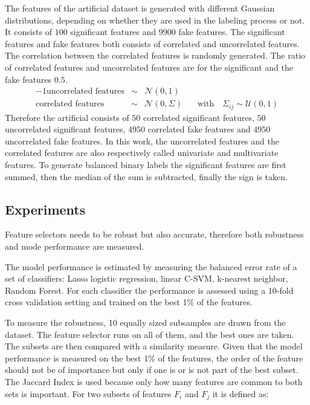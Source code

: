 \documentclass[twoside,11pt]{article}
\begin{document}
The features of the artificial dataset is generated with different Gaussian distributions, depending on whether they are used in the labeling process or not. It consists of $100$ significant features and $9900$ fake features. The significant features and fake features both consists of correlated and uncorrelated features. The correlation between the correlated features is randomly generated. The ratio of correlated features and uncorrelated features are for the significant and the fake features $0.5$. 
\begin{alignat}{-1}
\text{uncorrelated features} & \sim & \mathcal{N}(0, 1) & \\ 
\text{correlated features} & \sim & \mathcal{N}(0, \Sigma) & \quad \text{with} \quad \Sigma_{ij} \sim \mathcal{U}(0,1)
\end{alignat}
Therefore the artificial consists of $50$ correlated significant features, $50$ uncorrelated significant features, $4950$ correlated fake features and $4950$ uncorrelated fake features. In this work, the uncorrelated features and the correlated features are also respectively called univariate and  multivariate features.
To generate balanced binary labels the significant features are first summed, then the median of the sum is subtracted, finally the sign is taken. 


\subsection{Experiments}
\label{sec:experiments}

Feature selectors needs to be robust but also accurate, therefore both robustness and mode performance are measured.

The model performance is estimated by measuring the balanced error rate of a set of classifiers: Lasso logistic regression, linear C-SVM, k-nearest neighbor, Random Forest. 
For each classifier the performance is assessed using a 10-fold cross validation setting and trained on the best 1\% of the features.

To measure the robustness, 10 equally sized subsamples are drawn from the dataset. The feature selector runs on all of them, and the best ones are taken. The subsets are then compared with a similarity measure. Given that the model performance is measured on the best 1\% of the features, the order of the feature should not be of importance but only if one is or is not part of the best subset. The Jaccard Index is used because only how many features are common to both sets is important. For two subsets of features $F_i$ and $F_j$ it is defined as:
\end{document}
